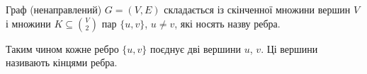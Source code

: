 Граф (ненаправлений) $G = (V,E)$ складається із скінченної множини вершин $V$ і множини $ K \subseteq {V \choose 2} $ пар $\{u,v\}$, $u \neq v$, які носять назву ребра.

Таким чином кожне ребро $\lbrace u,v\rbrace$ поєднує дві вершини $u$, $v$. Ці вершини називають кінцями ребра. 
